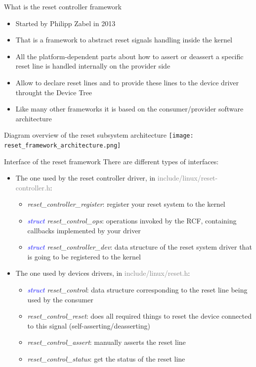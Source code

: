 \documentclass{beamer}
\begin{document}
\begin{frame}{What is the reset controller framework}
	\begin{itemize}
		\item Started by Philipp Zabel in 2013
		\item That is a framework to abstract reset signals handling inside the kernel
		\item All the platform-dependent parts about how to assert or deassert a specific reset line is handled internally on the provider side
		\item Allow to declare reset lines and to provide these lines to the device driver throught the Device Tree
		\item Like many other frameworks it is based on the consumer/provider software architecture
	\end{itemize}
\end{frame}

\begin{frame}{Diagram overview of the reset subsystem architecture}
	\centering
	\texttt{[image: reset\_framework\_architecture.png]}
\end{frame}

\begin{frame}{Interface of the reset framework}
	There are different types of interfaces:
	\begin{itemize}
		\item The one used by the reset controller driver, in \textcolor{gray}{include/linux/reset-controller.h}:
			\begin{itemize}
				\item \textit{reset\_controller\_register}: register your reset system to the kernel
				\item \textit{\textcolor{blue}{struct} reset\_control\_ops}: operations invoked by the RCF, containing callbacks implemented by your driver
				\item \textit{\textcolor{blue}{struct} reset\_controller\_dev}: data structure of the reset system driver that is going to be registered to the kernel
			\end{itemize}
	\end{itemize}
	\begin{itemize}
		\item The one used by devices drivers, in \textcolor{gray}{include/linux/reset.h}:
			\begin{itemize}
				\item \textit{\textcolor{blue}{struct} reset\_control}: data structure corresponding to the reset line being used by the consumer
				\item \textit{reset\_control\_reset}: does all required things to reset the device connected to this signal (self-asserting/deasserting)
				\item \textit{reset\_control\_assert}: manually asserts the reset line
				\item \textit{reset\_control\_status}: get the status of the reset line
			\end{itemize}
	\end{itemize}
\end{frame}
\end{document}
